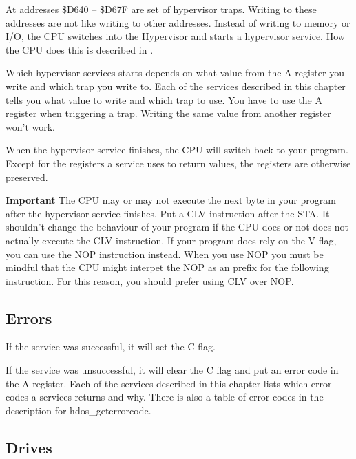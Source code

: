 At addresses \$D640 -- \$D67F are set of hypervisor traps. Writing to these
addresses are not like writing to other addresses. Instead of writing to memory
or I/O, the CPU switches into the Hypervisor and starts a hypervisor service.
How the CPU does this is described in .

Which hypervisor services starts depends on what value from the A register you
write and which trap you write to. Each of the services described in this
chapter tells you what value to write and which trap to use. You have to use the
A register when triggering a trap. Writing the same value from another register
won't work.

When the hypervisor service finishes, the CPU will switch back to your program.
Except for the registers a service uses to return values, the registers are
otherwise preserved.

\textbf{Important} The CPU may or may not execute the next byte in your program
after the hypervisor service finishes. Put a CLV instruction after the STA.
It shouldn't change the behaviour of your program if the CPU does or not does
not actually execute the CLV instruction. If your program does rely on the V
flag, you can use the NOP instruction instead. When you use NOP you must be
mindful that the CPU might interpet the NOP as an prefix for the following
instruction. For this reason, you should prefer using CLV over NOP.

\subsection{Errors}

If the service was successful, it will set the C flag.

If the service was unsuccessful, it will clear the C flag and put an error code
in the A register. Each of the services described in this chapter lists which
error codes a services returns and why. There is also a table of error codes in
the description for hdos\_geterrorcode.

\subsection{Drives}


